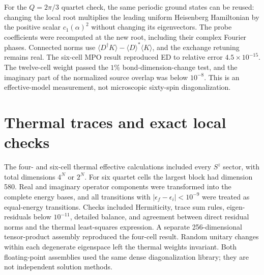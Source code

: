 For the $Q=2\pi/3$ quartet check, the same periodic ground states can be
reused: changing the local root multiplies the leading uniform Heisenberg
Hamiltonian by the positive scalar $c_1(\alpha)^2$ without changing its
eigenvectors. The probe coefficients were recomputed at the new root,
including their complex Fourier phases. Connected norms use
$\langle D^\dagger K\rangle-\langle D\rangle^*\langle K\rangle$,
and the exchange retuning remains real. The six-cell MPO result reproduced
ED to relative error $4.5\times10^{-15}$. The twelve-cell weight passed the
$1\%$ bond-dimension-change test, and the imaginary part of the normalized
source overlap was below $10^{-8}$. This is an effective-model measurement,
not microscopic sixty-spin diagonalization.

\section{Thermal traces and exact local checks}
\label{app:exact-local-check}

The four- and six-cell thermal effective calculations included every
$S^z$ sector, with total dimensions $4^N$ or $2^N$. For six quartet
cells the largest block had dimension 580. Real and imaginary operator
components were transformed into the complete energy bases, and all
transitions with $|\epsilon_f-\epsilon_i|<10^{-9}$ were treated as
equal-energy transitions. Checks included Hermiticity, trace sum rules,
eigen-residuals below $10^{-11}$, detailed balance, and agreement between
direct residual norms and the thermal least-squares expression. A separate
256-dimensional tensor-product assembly reproduced the four-cell result.
Random unitary changes within each degenerate eigenspace left the thermal
weights invariant. Both floating-point assemblies used the same dense
diagonalization library; they are not independent solution methods.


